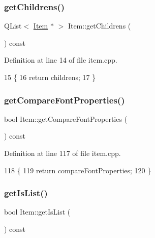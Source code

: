 \subsubsection{\texorpdfstring{get\+Childrens()}{getChildrens()}}
{\footnotesize\ttfamily Q\+List$<$ \hyperlink{class_item}{Item} $\ast$ $>$ Item\+::get\+Childrens (\begin{DoxyParamCaption}{ }\end{DoxyParamCaption}) const}



Definition at line 14 of file item.\+cpp.


\begin{DoxyCode}
15 \{
16     \textcolor{keywordflow}{return} childrens;
17 \}
\end{DoxyCode}
\mbox{\label{class_item_ae7708e01436a0b0595152fea8e77eb0c}} 
\subsubsection{\texorpdfstring{get\+Compare\+Font\+Properties()}{getCompareFontProperties()}}
{\footnotesize\ttfamily bool Item\+::get\+Compare\+Font\+Properties (\begin{DoxyParamCaption}{ }\end{DoxyParamCaption}) const}



Definition at line 117 of file item.\+cpp.


\begin{DoxyCode}
118 \{
119     \textcolor{keywordflow}{return} compareFontProperties;
120 \}
\end{DoxyCode}
\mbox{\label{class_item_a0aac23b6c71f5e1246db2584340606a2}} 
\subsubsection{\texorpdfstring{get\+Is\+List()}{getIsList()}}
{\footnotesize\ttfamily bool Item\+::get\+Is\+List (\begin{DoxyParamCaption}{ }\end{DoxyParamCaption}) const}



